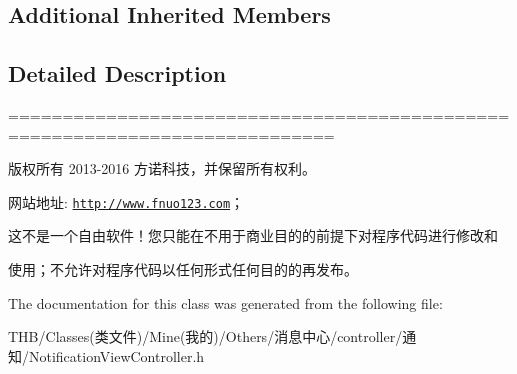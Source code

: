 \subsection*{Additional Inherited Members}


\subsection{Detailed Description}
============================================================================

版权所有 2013-\/2016 方诺科技，并保留所有权利。

网站地址\+: \href{http://www.fnuo123.com}{\tt http\+://www.\+fnuo123.\+com}； 



这不是一个自由软件！您只能在不用于商业目的的前提下对程序代码进行修改和

使用；不允许对程序代码以任何形式任何目的的再发布。 

 

The documentation for this class was generated from the following file\+:\begin{DoxyCompactItemize}
\item 
T\+H\+B/\+Classes(类文件)/\+Mine(我的)/\+Others/消息中心/controller/通知/Notification\+View\+Controller.\+h\end{DoxyCompactItemize}
